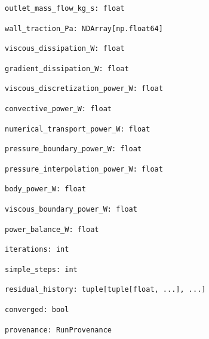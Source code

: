 \begin{lstlisting}
outlet_mass_flow_kg_s: float
\end{lstlisting}
\begin{lstlisting}
wall_traction_Pa: NDArray[np.float64]
\end{lstlisting}
\begin{lstlisting}
viscous_dissipation_W: float
\end{lstlisting}
\begin{lstlisting}
gradient_dissipation_W: float
\end{lstlisting}
\begin{lstlisting}
viscous_discretization_power_W: float
\end{lstlisting}
\begin{lstlisting}
convective_power_W: float
\end{lstlisting}
\begin{lstlisting}
numerical_transport_power_W: float
\end{lstlisting}
\begin{lstlisting}
pressure_boundary_power_W: float
\end{lstlisting}
\begin{lstlisting}
pressure_interpolation_power_W: float
\end{lstlisting}
\begin{lstlisting}
body_power_W: float
\end{lstlisting}
\begin{lstlisting}
viscous_boundary_power_W: float
\end{lstlisting}
\begin{lstlisting}
power_balance_W: float
\end{lstlisting}
\begin{lstlisting}
iterations: int
\end{lstlisting}
\begin{lstlisting}
simple_steps: int
\end{lstlisting}
\begin{lstlisting}
residual_history: tuple[tuple[float, ...], ...]
\end{lstlisting}
\begin{lstlisting}
converged: bool
\end{lstlisting}
\begin{lstlisting}
provenance: RunProvenance
\end{lstlisting}
